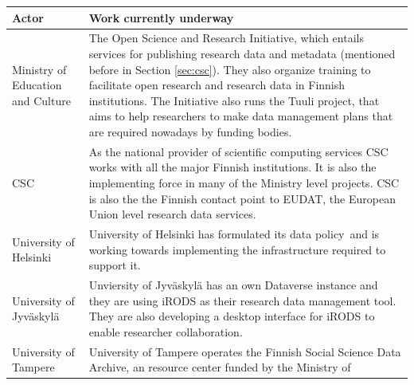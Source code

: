 \label{table:finland}
\begin{tabularx}{\textwidth}{| >{\raggedright}p{3cm} | X |}
  \hline
  \textbf{Actor}                            & \textbf{Work currently underway} \\
  \hline
  \rowcolor{Gray}
  Ministry of Education and Culture         & The Open Science and Research Initiative\footnotemark,
                                              which entails services for publishing research data and metadata (mentioned
                                              before in Section \ref{sec:csc}). They also
                                              organize training to facilitate open research and research data in Finnish
                                              institutions. The Initiative also runs the Tuuli project, that aims to
                                              help researchers to make data management plans that are required nowadays
                                              by funding bodies.\\
  \hline
  CSC                                       & As the national provider of scientific computing services CSC works with
                                              all the major Finnish institutions. It is also the implementing force in
                                              many of the Ministry level projects. CSC is also the the Finnish contact
                                              point to EUDAT, the European Union level research data services.\\
  \hline
  \rowcolor{Gray}
  University of Helsinki                    & University of Helsinki has formulated its data policy\footnotemark~and
                                              is working towards implementing the infrastructure required to support
                                              it.\footnotemark\\
  \hline
  University of Jyväskylä                   & Unviersity of Jyväskylä has an own Dataverse instance and they are using
                                              iRODS as their research data management tool. They are also developing a
                                              desktop interface for iRODS to enable researcher collaboration.\\
  \hline
  \rowcolor{Gray}
  University of Tampere                     & University of Tampere operates the Finnish Social Science Data
                                              Archive\footnotemark, an resource center funded by the Ministry of

\end{tabularx}
